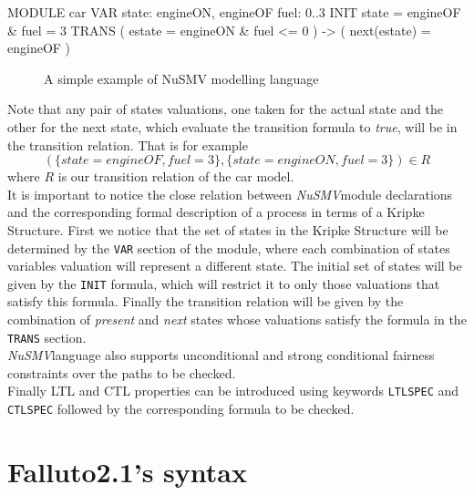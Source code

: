 \documentclass[12pt]{article}
\newcommand{\nusmv}{\mbox{\textit{NuSMV}}}
\begin{document}
\begin{verbbox}
MODULE car
    VAR
        state: {engineON, engineOF}
        fuel: 0..3
    INIT
        state = engineOF & fuel = 3
    TRANS
        ( estate = engineON & fuel <= 0 ) 
        -> 
        ( next(estate) = engineOF )
\end{verbbox}
\begin{figure}[h]
\begin{framed}
    \centering
    \theverbbox
\end{framed}
    \caption{A simple example of NuSMV modelling language}
    \label{nusmvexample}
\end{figure}
Note that any pair of states valuations, one taken for the actual state and the
other for the next state, which evaluate the transition formula to \textit{true},
will be in the transition relation. That is for example
$$(\{state=engineOF, fuel=3\},\{state=engineON,fuel=3\}) \in R$$ where $R$ is our
transition relation of the car model.\\
It is important to notice the close relation between \nusmv module declarations and the corresponding formal description of a process in terms of a Kripke Structure. First we notice that the set of states in the Kripke Structure will be determined by the \texttt{VAR} section of the module, where each combination of states variables valuation will represent a different state. The initial set of states will be given by the \texttt{INIT} formula, which will restrict it to only those valuations that satisfy this formula. Finally the transition relation will be given by the combination of \textit{present} and \textit{next} states whose valuations satisfy the formula in the \texttt{TRANS} section.\\
\nusmv language also supports unconditional and strong conditional fairness constraints over the paths to be checked.\\
Finally LTL and CTL properties can be introduced using keywords \texttt{LTLSPEC} and \texttt{CTLSPEC} followed by the corresponding formula to be checked.



\section{Falluto2.1's syntax}
\end{document}
